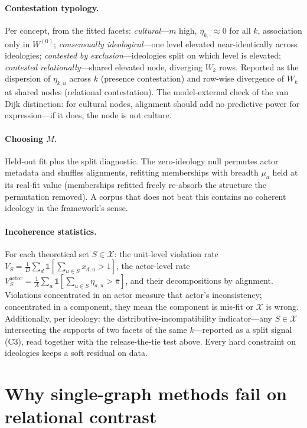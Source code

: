 \documentclass[11pt]{article}
\newcommand{\Xcal}{\mathcal{X}}
\newcommand{\1}{\mathbb{1}}
\begin{document}
\paragraph{Contestation typology.} Per concept, from the fitted facets: \emph{cultural}---$m$ high, $\eta_{k,\cdot}\approx0$ for all $k$, association only in $W^{(0)}$; \emph{consensually ideological}---one level elevated near-identically across ideologies; \emph{contested by exclusion}---ideologies split on which level is elevated; \emph{contested relationally}---shared elevated node, diverging $W_k$ rows. Reported as the dispersion of $\eta_{k,u}$ across $k$ (presence contestation) and row-wise divergence of $W_k$ at shared nodes (relational contestation). The model-external check of the van Dijk distinction: for cultural nodes, alignment should add no predictive power for expression---if it does, the node is not culture.

\paragraph{Choosing $M$.} Held-out fit plus the split diagnostic. The zero-ideology null permutes actor metadata and shuffles alignments, refitting memberships with breadth $\mu_a$ held at its real-fit value (memberships refitted freely re-absorb the structure the permutation removed). A corpus that does not beat this contains no coherent ideology in the framework's sense.

\paragraph{Incoherence statistics.} For each theoretical set $S\in\Xcal$: the unit-level violation rate $V_S=\frac1D\sum_d\1[\sum_{u\in S}x_{d,u}>1]$, the actor-level rate $V^{\text{actor}}_S=\frac1A\sum_a\1[\sum_{u\in S}\eta_{a,u}>\bar\pi]$, and their decompositions by alignment. Violations concentrated in an actor measure that actor's inconsistency; concentrated in a component, they mean the component is mis-fit or $\Xcal$ is wrong. Additionally, per ideology: the distributive-incompatibility indicator---any $S\in\Xcal$ intersecting the supports of two facets of the same $k$---reported as a split signal (C3), read together with the release-the-tie test above. Every hard constraint on ideologies keeps a soft residual on data.

\section{Why single-graph methods fail on relational contrast}\label{sec:single}
\end{document}
